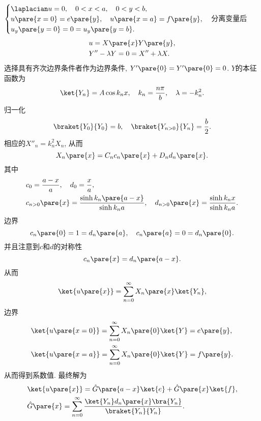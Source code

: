 \documentclass[hidelinks]{ctexart}
\begin{document}
\begin{sample}
    \begin{ex}
        $\displaystyle \begin{cases}
            \laplacian u = 0,\quad 0 < x < a,\quad 0 < y < b, \\
            u\pare{x=0} = e\pare{y},\quad u\pare{x=a} = f\pare{y}, \\
            u_y\pare{y=0} = 0 = u_y\pare{y=b}.
        \end{cases}$分离变量后
        \begin{align*}
            & u = X\pare{x}Y\pare{y}, \\
            & Y'' - \lambda Y = 0 = X'' + \lambda X.
        \end{align*}
        选择具有齐次边界条件者作为边界条件, $Y'\pare{0} = Y'\pare{0} = 0$. $Y$的本征函数为
        \[ \ket{Y_n} = A \cos k_n x,\quad k_n = \frac{n\pi}{b},\quad \lambda = -k_n^2. \]
        归一化
        \[ \braket{Y_0}{Y_0} = b,\quad \braket{Y_{n>0}}{Y_n} = \frac{b}{2}. \]
        相应的$X''_n = k_n^2 X_n$, 从而
        \[ X_n\pare{x} = C_nc_n\pare{x} + D_nd_n\pare{x}. \]
        其中
        \begin{align*}
            & c_0 = \frac{a-x}{a},\quad d_0 = \frac{x}{a},\\ &c_{n>0}\pare{x} = \frac{\sinh k_n\pare{a-x}}{\sinh k_n a},\quad d_{n>0}\pare{x} = \frac{\sinh k_nx}{\sinh k_na}.
        \end{align*}
        边界
        \[ c_n\pare{0} = 1 = d_n\pare{a},\quad c_n\pare{a} = 0 = d_n\pare{0}. \]
        并且注意到$c$和$d$的对称性
        \[ c_n\pare{x} = d_n\pare{a-x}. \]
        从而
        \[ \ket{u\pare{x}} = \sum_{n=0}^\infty X_n\pare{x}\ket{Y_n}, \]
        边界
        \begin{align*}
            &\ket{u\pare{x=0}} = \sum_{n=0}^\infty X_n\pare{0}\ket{Y} = e\pare{y},\\
            &\ket{u\pare{x=a}} = \sum_{n=0}^\infty X_n\pare{0}\ket{Y} = f\pare{y}.
        \end{align*}
        从而得到系数值. 最终解为
        \begin{align*}
            & \ket{u\pare{x}} = \hat{G}\pare{a-x}\ket{e} + \hat{G}\pare{x}\ket{f}, \\
            & \hat{G}\pare{x} = \sum_{n=0}^\infty \frac{\ket{Y_n}d_n\pare{x}\bra{Y_n}}{\braket{Y_n}{Y_n}}.
        \end{align*}
    \end{ex}
\end{sample}
\end{document}
